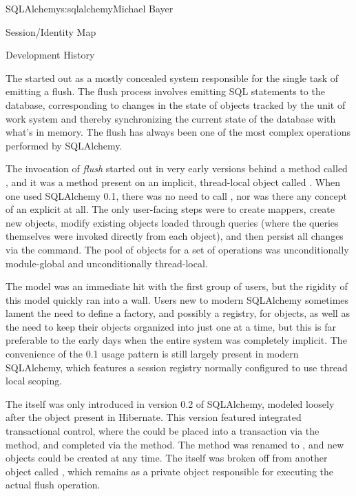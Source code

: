 \begin{aosachapter}{SQLAlchemy}{s:sqlalchemy}{Michael Bayer}
\begin{aosasect1}{Session/Identity Map}
\begin{aosasect2}{Development History}

The  started out as a mostly concealed system responsible
for the single task of emitting a flush. The flush process involves emitting SQL
statements to the database, corresponding to changes in the state of objects
tracked by the unit of work system and thereby synchronizing the current state
of the database with what's in memory. The flush has always been one of the most
complex operations performed by SQLAlchemy.

The invocation of \emph{flush} started out in very early versions behind a method
called , and it was a method present on an implicit, thread-local
object called . When one used SQLAlchemy 0.1, there was no need
to call , nor was there any concept of an explicit
 at all. The only user-facing steps were to create mappers, create
new objects, modify existing objects loaded through queries (where the queries
themselves were invoked directly from each  object), and then
persist all changes via the  command.
The pool of objects for a set of operations
was unconditionally module-global and unconditionally thread-local.

The  model was an immediate hit with the first group
of users, but the rigidity of this model
quickly ran into a wall. Users new to modern SQLAlchemy
sometimes lament the need to define a factory, and possibly a registry, for
 objects, as well as the need to keep their objects organized into
just one  at a time, but this is far
preferable to the early days when the entire system was completely implicit. The
convenience of the 0.1 usage pattern is still largely present in modern
SQLAlchemy, which features a session registry normally configured to
use thread local scoping.

The  itself was only introduced in version 0.2 of SQLAlchemy,
modeled loosely after the  object present in Hibernate.   This version featured
integrated transactional control, where the  could
be placed into a transaction via the  method, and completed
via the  method.   The  method
was renamed to , and new  objects
could be created at any time.   The  itself was broken off
from another object called , which remains as a private
object responsible for executing the actual flush operation.


\end{aosasect2}
\end{aosasect1}
\end{aosachapter}
